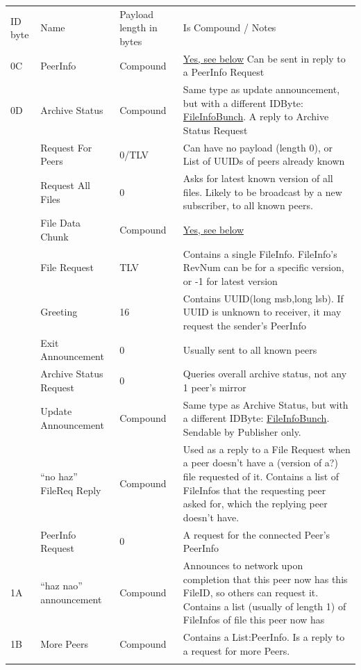 \documentclass[12pt,a4paper,]{adreport}
\begin{document}
\begin{longtable}[c]{@{}llll@{}}
\toprule\addlinespace
ID byte & Name & Payload length in bytes & Is Compound / Notes
\\\addlinespace
\midrule\endhead
0C & PeerInfo & Compound & \hyperref[PeerInfo]{Yes, see below} Can be
sent in reply to a PeerInfo Request
\\\addlinespace
0D & Archive Status & Compound & Same type as update announcement, but
with a different IDByte: \hyperref[FileInfoBunch]{FileInfoBunch}. A
reply to Archive Status Request
\\\addlinespace
10 & Request For Peers & 0/TLV & Can have no payload (length 0), or List
of UUIDs of peers already known
\\\addlinespace
11 & Request All Files & 0 & Asks for latest known version of all files.
Likely to be broadcast by a new subscriber, to all known peers.
\\\addlinespace
12 & File Data Chunk & Compound & \hyperref[FileDataChunk]{Yes, see
below}
\\\addlinespace
13 & File Request & TLV & Contains a single FileInfo. FileInfo's RevNum
can be for a specific version, or -1 for latest version
\\\addlinespace
14 & Greeting & 16 & Contains UUID(long msb,long lsb). If UUID is
unknown to receiver, it may request the sender's PeerInfo
\\\addlinespace
15 & Exit Announcement & 0 & Usually sent to all known peers
\\\addlinespace
16 & Archive Status Request & 0 & Queries overall archive status, not
any 1 peer's mirror
\\\addlinespace
17 & Update Announcement & Compound & Same type as Archive Status, but
with a different IDByte: \hyperref[FileInfoBunch]{FileInfoBunch}.
Sendable by Publisher only.
\\\addlinespace
18 & ``no haz'' FileReq Reply & Compound & Used as a reply to a File
Request when a peer doesn't have a (version of a?) file requested of it.
Contains a list of FileInfos that the requesting peer asked for, which
the replying peer doesn't have.
\\\addlinespace
19 & PeerInfo Request & 0 & A request for the connected Peer's PeerInfo
\\\addlinespace
1A & ``haz nao'' announcement & Compound & Announces to network upon
completion that this peer now has this FileID, so others can request it.
Contains a list (usually of length 1) of FileInfos of file this peer now
has
\\\addlinespace
1B & More Peers & Compound & Contains a List:PeerInfo. Is a reply to a
request for more Peers.
\\\addlinespace
\bottomrule
\end{longtable}
\end{document}
